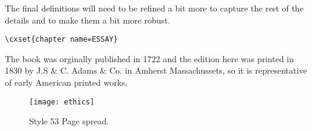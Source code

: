The final definitions will need to be refined a bit more to capture the rest of the details and to make them 
a bit more robust.


\begin{verbatim}
\cxset{chapter name=ESSAY}
\end{verbatim}
The book was orginally published in 1722 and the edition here was printed in 1830 by J.S \& C. Adams \& Co. in Amherst Massachussets, so it is representative of early American printed works.
\begin{figure}[ht]
\centering
\texttt{[image: ethics]}
\caption{Style 53 Page spread.}
\end{figure}


\restoregeometry
\makeatletter
\@chaptertitlespecialfalse%
\hsize\@tempdima
\columnwidth\hsize
\makeatother






